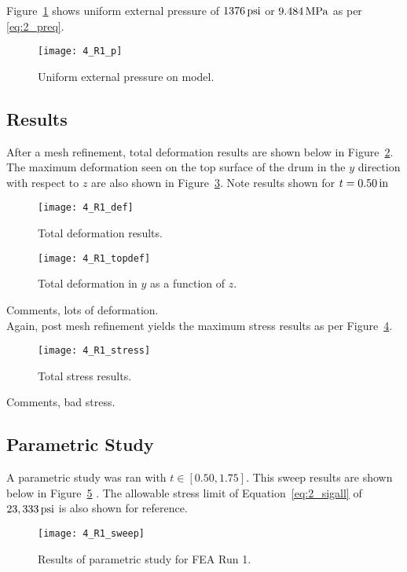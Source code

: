 Figure~\ref{fig:4_R1_p} shows uniform external pressure of $1376 \,\mathrm{psi}$ or $9.484 \,\mathrm{MPa}$ as per \ref{eq:2_preq}.
\begin{figure}[H]
	\centering
	\texttt{[image: 4\_R1\_p]}
	\caption{Uniform external pressure on model.}
	\label{fig:4_R1_p}
\end{figure}

\subsection{Results}

After a mesh refinement, total deformation results are shown below in Figure~\ref{fig:4_R1_def}. The maximum deformation seen on the top surface of the drum in the $y$ direction with respect to $z$ are also shown in Figure~\ref{fig:4_R1_topdef}. Note results shown for $t=0.50\,\mathrm{in}$

\begin{figure}[H]
	\centering
	\texttt{[image: 4\_R1\_def]}
	\caption{Total deformation results.}
	\label{fig:4_R1_def}
\end{figure}
\begin{figure}[H]
	\centering
	\texttt{[image: 4\_R1\_topdef]}
	\caption{Total deformation in $y$ as a function of $z$.}
	\label{fig:4_R1_topdef}
\end{figure}

Comments, lots of deformation.\\

Again, post mesh refinement yields the maximum stress results as per Figure~\ref{fig:4_R1_stress}.

\begin{figure}[H]
	\centering
	\texttt{[image: 4\_R1\_stress]}
	\caption{Total stress results.}
	\label{fig:4_R1_stress}
\end{figure}

Comments, bad stress.


\subsection{Parametric Study}

A parametric study was ran with $t \in [0.50, 1.75]$. This sweep results are shown below in Figure~\ref{fig:4_R1_sweep} \cite{EXCEL}. The allowable stress limit of Equation~\ref{eq:2_sigall} of $23,333 \,\mathrm{psi}$ is also shown for reference.

\begin{figure}[H]
	\centering
	\texttt{[image: 4\_R1\_sweep]}
	\caption{Results of parametric study for FEA Run 1.}
	\label{fig:4_R1_sweep}
\end{figure}

